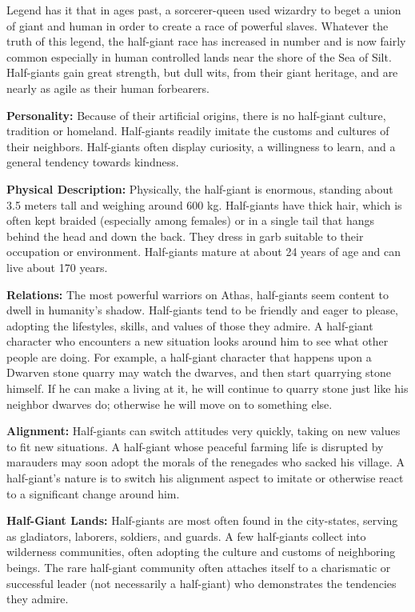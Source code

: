 Legend has it that in ages past, a sorcerer-queen used wizardry to beget a union of giant and human in order to create a race of powerful slaves. Whatever the truth of this legend, the half-giant race has increased in number and is now fairly common especially in human controlled lands near the shore of the Sea of Silt. Half-giants gain great strength, but dull wits, from their giant heritage, and are nearly as agile as their human forbearers.

\textbf{Personality:} Because of their artificial origins, there is no half-giant culture, tradition or homeland. Half-giants readily imitate the customs and cultures of their neighbors. Half-giants often display curiosity, a willingness to learn, and a general tendency towards kindness.

\textbf{Physical Description:} Physically, the half-giant is enormous, standing about 3.5 meters tall and weighing around 600 kg. Half-giants have thick hair, which is often kept braided (especially among females) or in a single tail that hangs behind the head and down the back. They dress in garb suitable to their occupation or environment. Half-giants mature at about 24 years of age and can live about 170 years.

\textbf{Relations:} The most powerful warriors on Athas, half-giants seem content to dwell in humanity's shadow. Half-giants tend to be friendly and eager to please, adopting the lifestyles, skills, and values of those they admire. A half-giant character who encounters a new situation looks around him to see what other people are doing. For example, a half-giant character that happens upon a Dwarven stone quarry may watch the dwarves, and then start quarrying stone himself. If he can make a living at it, he will continue to quarry stone just like his neighbor dwarves do; otherwise he will move on to something else.

\textbf{Alignment:} Half-giants can switch attitudes very quickly, taking on new values to fit new situations. A half-giant whose peaceful farming life is disrupted by marauders may soon adopt the morals of the renegades who sacked his village. A half-giant's nature is to switch his alignment aspect to imitate or otherwise react to a significant change around him.

\textbf{Half-Giant Lands:} Half-giants are most often found in the city-states, serving as gladiators, laborers, soldiers, and guards. A few half-giants collect into wilderness communities, often adopting the culture and customs of neighboring beings. The rare half-giant community often attaches itself to a charismatic or successful leader (not necessarily a half-giant) who demonstrates the tendencies they admire.

